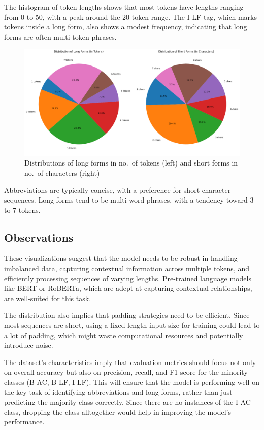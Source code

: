 \documentclass[a4paper,11pt]{article}
\begin{document}
The histogram of token lengths shows that most tokens have lengths ranging from
0 to 50, with a peak around the 20 token range. The I-LF tag, which marks
tokens inside a long form, also shows a modest frequency, indicating that long
forms are often multi-token phrases.

\begin{figure}[H]
	\centering
	\includegraphics[width=6.5in]{./assets/dist_lf_abbr.png}
	\caption{Distributions of long forms in no.\ of tokens (left) and short forms in no.\ of characters (right)}\label{fig:dist_lf_abbr}
\end{figure}

Abbreviations are typically concise, with a preference for short character
sequences. Long forms tend to be multi-word phrases, with a tendency toward 3
to 7 tokens.

\subsection{Observations}

These visualizations suggest that the model needs to be robust in handling
imbalanced data, capturing contextual information across multiple tokens, and
efficiently processing sequences of varying lengths. Pre-trained language
models like BERT or RoBERTa, which are adept at capturing contextual
relationships, are well-suited for this task.

The distribution also implies that padding strategies need to be efficient.
Since most sequences are short, using a fixed-length input size for training
could lead to a lot of padding, which might waste computational resources and
potentially introduce noise.

The dataset's characteristics imply that evaluation metrics should focus not
only on overall accuracy but also on precision, recall, and F1-score for the
minority classes (B-AC, B-LF, I-LF). This will ensure that the model is
performing well on the key task of identifying abbreviations and long forms,
rather than just predicting the majority class correctly. Since there are no
instances of the I-AC class, dropping the class alltogether would help in
improving the model's performance.
\end{document}
